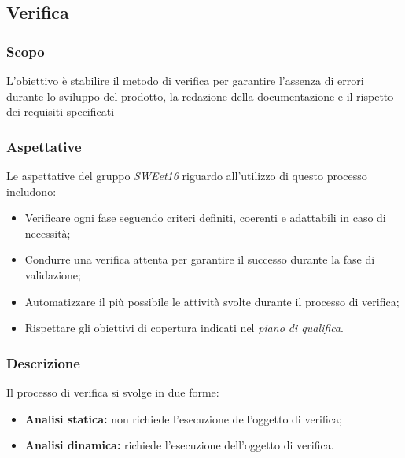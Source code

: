 
\subsection{Verifica}
\subsubsection{Scopo}
L'obiettivo è stabilire il metodo di verifica per garantire l'assenza
di errori durante lo sviluppo del prodotto, la redazione della documentazione
e il rispetto dei requisiti specificati
\subsubsection{Aspettative}
Le aspettative del gruppo \emph{SWEet16} riguardo all'utilizzo di questo processo includono:
\begin{itemize}
    \item Verificare ogni fase seguendo criteri definiti, coerenti e adattabili in caso di necessità;
    \item Condurre una verifica attenta per garantire il successo durante la fase di validazione;
    \item Automatizzare il più possibile le attività svolte durante il processo di verifica;
    \item Rispettare gli obiettivi di copertura indicati nel \emph{piano di qualifica}.
\end{itemize}
\subsubsection{Descrizione}
Il processo di verifica si svolge in due forme:
\begin{itemize}
    \item \textbf{Analisi statica:} non richiede l'esecuzione dell'oggetto di verifica;
    \item \textbf{Analisi dinamica: } richiede l'esecuzione dell'oggetto di verifica.
\end{itemize}
